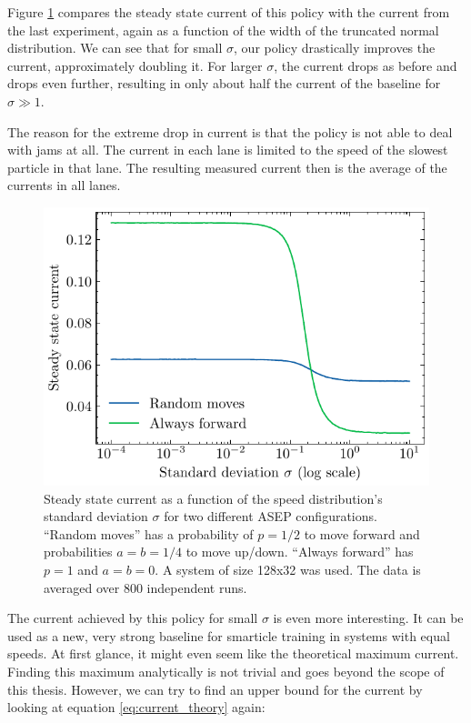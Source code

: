 Figure \ref{fig:steady_state_current_always_forward} compares the steady state current of this policy with the current from the last experiment, again as a function of the width of the truncated normal distribution. We can see that for small $\sigma$, our policy drastically improves the current, approximately doubling it. For larger $\sigma$, the current drops as before and drops even further, resulting in only about half the current of the baseline for $\sigma\gg 1$. 


The reason for the extreme drop in current is that the policy is not able to deal with jams at all. The current in each lane is limited to the speed of the slowest particle in that lane. The resulting measured current then is the average of the currents in all lanes. 

\begin{figure}[H]
    \centering
    \includegraphics{steady_state_current_both_log.pdf}
    \caption{Steady state current as a function of the speed distribution's standard deviation $\sigma$ for two different ASEP configurations. \enquote{Random moves} has a probability of $p=1/2$ to move forward and probabilities $a=b=1/4$ to move up/down. \enquote{Always forward} has $p=1$ and $a=b=0$. A system of size 128x32 was used. The data is averaged over 800 independent runs.}
    \label{fig:steady_state_current_always_forward}
\end{figure}
The current achieved by this policy for small $\sigma$ is even more interesting. It can be used as a new, very strong baseline for smarticle training in systems with equal speeds. At first glance, it might even seem like the theoretical maximum current. Finding this maximum analytically is not trivial and goes beyond the scope of this thesis. However, we can try to find an upper bound for the current by looking at equation \ref{eq:current_theory} again:
